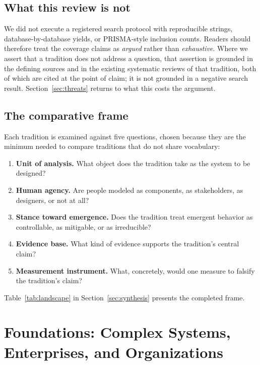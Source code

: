 \documentclass[11pt,a4paper]{article}
\begin{document}
\subsection{What this review is not}

We did not execute a registered search protocol with reproducible strings,
database-by-database yields, or PRISMA-style inclusion counts. Readers should
therefore treat the coverage claims as \emph{argued} rather than
\emph{exhaustive}. Where we assert that a tradition does not address a question,
that assertion is grounded in the defining sources and in the existing
systematic reviews of that tradition, both of which are cited at the point of
claim; it is not grounded in a negative search result. Section~\ref{sec:threats}
returns to what this costs the argument.

\subsection{The comparative frame}

Each tradition is examined against five questions, chosen because they are the
minimum needed to compare traditions that do not share vocabulary:

\begin{enumerate}
\item \textbf{Unit of analysis.} What object does the tradition take as the
system to be designed?
\item \textbf{Human agency.} Are people modeled as components, as stakeholders,
as designers, or not at all?
\item \textbf{Stance toward emergence.} Does the tradition treat emergent
behavior as controllable, as mitigable, or as irreducible?
\item \textbf{Evidence base.} What kind of evidence supports the tradition's
central claim?
\item \textbf{Measurement instrument.} What, concretely, would one measure to
falsify the tradition's claim?
\end{enumerate}

Table~\ref{tab:landscape} in Section~\ref{sec:synthesis} presents the completed
frame.

\section{Foundations: Complex Systems, Enterprises, and Organizations}
\label{sec:foundations}
\end{document}
